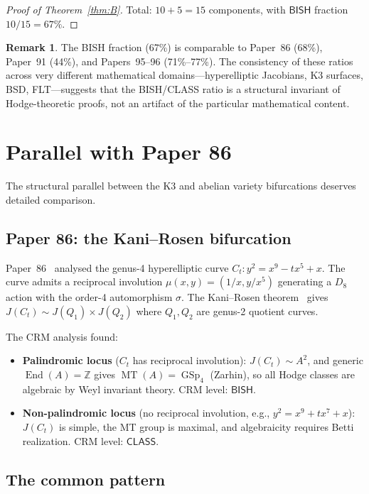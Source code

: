 \documentclass[11pt,a4paper]{article}
\theoremstyle{plain}
\theoremstyle{definition}
\newtheorem{remark}[theorem]{Remark}
\newcommand{\BISH}{\textsf{BISH}}
\newcommand{\CLASS}{\textsf{CLASS}}
\newcommand{\Z}{\mathbb{Z}}
\DeclareMathOperator{\End}{End}
\DeclareMathOperator{\MT}{MT}
\DeclareMathOperator{\GSp}{GSp}
\begin{document}
\begin{proof}[Proof of Theorem~\ref{thm:B}]
\medskip
\noindent Total: $10 + 5 = 15$ components, with $\BISH$ fraction $10/15 = 67\%$.
\end{proof}

\begin{remark}
The BISH fraction (67\%) is comparable to Paper~86 (68\%), Paper~91 (44\%), and Papers~95--96 (71\%--77\%). The consistency of these ratios across very different mathematical domains---hyperelliptic Jacobians, K3 surfaces, BSD, FLT---suggests that the BISH/CLASS ratio is a structural invariant of Hodge-theoretic proofs, not an artifact of the particular mathematical content.
\end{remark}


\section{Parallel with Paper 86}\label{sec:parallel}

The structural parallel between the K3 and abelian variety bifurcations deserves detailed comparison.

\subsection{Paper 86: the Kani--Rosen bifurcation}

Paper~86~\cite{lee-p86} analysed the genus-4 hyperelliptic curve $C_t : y^2 = x^9 - tx^5 + x$. The curve admits a reciprocal involution $\mu(x,y) = (1/x, y/x^5)$ generating a $D_8$ action with the order-4 automorphism $\sigma$. The Kani--Rosen theorem~\cite{kani-rosen} gives $J(C_t) \sim J(Q_1) \times J(Q_2)$ where $Q_1, Q_2$ are genus-2 quotient curves.

The CRM analysis found:
\begin{itemize}
  \item \textbf{Palindromic locus} ($C_t$ has reciprocal involution): $J(C_t) \sim A^2$, and generic $\End(A) = \Z$ gives $\MT(A) = \GSp_4$ (Zarhin), so all Hodge classes are algebraic by Weyl invariant theory. CRM level: $\BISH$.
  \item \textbf{Non-palindromic locus} (no reciprocal involution, e.g., $y^2 = x^9 + tx^7 + x$): $J(C_t)$ is simple, the MT group is maximal, and algebraicity requires Betti realization. CRM level: $\CLASS$.
\end{itemize}

\subsection{The common pattern}
\end{document}
